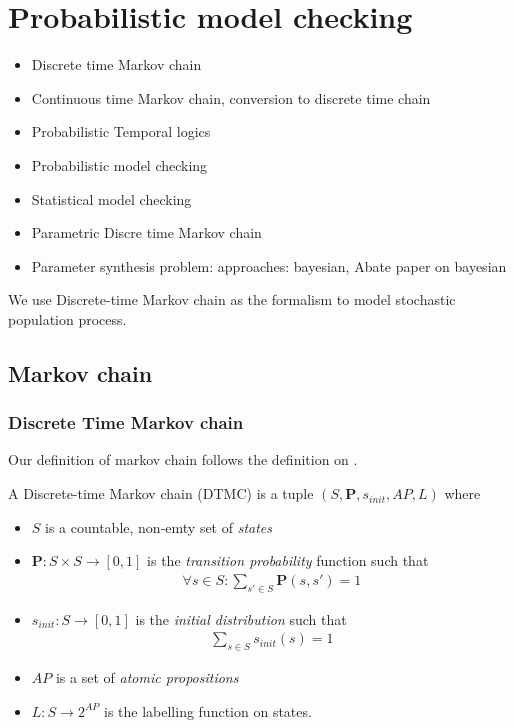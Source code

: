 \chapter{Probabilistic model checking}
 {\color{red}
  \begin{itemize}
      \item Discrete time Markov chain
      \item Continuous time Markov chain, conversion to discrete time chain
      \item Probabilistic Temporal logics
      \item Probabilistic model checking
      \item Statistical model checking
      \item Parametric Discre time Markov chain
      \item Parameter synthesis problem: approaches: bayesian, Abate paper on bayesian
  \end{itemize}
 }

We use Discrete-time Markov chain as the formalism to model stochastic population process.


\section{Markov chain}
\subsection{Discrete Time Markov chain}
Our definition of markov chain follows the definition on \cite{baier2008principles}.
\begin{definition}
    A Discrete-time Markov chain (DTMC) is a tuple $(S,\mathbf{P}, s_{init}, AP, L)$ where
    \begin{itemize}
        \item $S$ is a countable, non-emty set of \textit{states}
        \item $\mathbf{P}:S\times S \rightarrow [0,1]$ is the \textit{transition probability}
              function such that
              \begin{align*}
                  \forall s \in S : \sum_{s'\in S}\mathbf{P}(s, s') = 1
              \end{align*}
        \item $s_{init}: S \rightarrow [0,1]$ is the \textit{initial distribution} such that
              \begin{align*}
                  \sum_{s\in S}s_{init}(s) = 1
              \end{align*}
        \item $AP$ is a set of \textit{atomic propositions}
        \item $L: S \rightarrow 2^{AP}$ is the labelling function on states.
    \end{itemize}
\end{definition}

